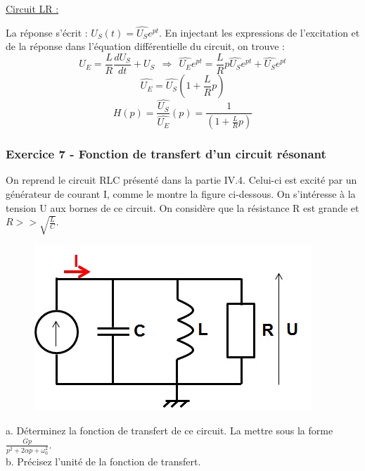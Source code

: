 \documentclass[11pt]{report}
\begin{document}
	\underline{Circuit LR :}
	
	La réponse s'écrit : $U_S(t)=\hat{U_S}e^{pt}$. En injectant les expressions de l'excitation et de la réponse dans l'équation différentielle du circuit, on trouve :
	\begin{equation*}
	U_E=\frac{L}{R}\frac{dU_S}{dt}+U_S~~\Rightarrow~~\hat{U_E}e^{pt}=\frac{L}{R}p\hat{U_S}e^{pt}+\hat{U_S}e^{pt}
	\end{equation*}
	\begin{equation*}
	\hat{U_E}=\hat{U_S}(1+\frac{L}{R}p)
	\end{equation*}
	\begin{equation*}
	H(p)=\frac{\hat{U_S}}{\hat{U_E}}(p)=\frac{1}{(1+\frac{L}{R}p)}
	\end{equation*}
	 	
 	
 	\vspace{1\baselineskip}
 	
 	\subsubsection{Exercice 7 - Fonction de transfert d'un circuit résonant}
 	
 	On reprend le circuit RLC présenté dans la partie IV.4. Celui-ci est excité par un générateur de courant I, comme le montre la figure ci-dessous. On s'intéresse à la tension U aux bornes de ce circuit. On considère que la résistance R est grande et $R>>\sqrt{\frac{L}{C}}$.
 	 	
 	\begin{figure}[h!]
 		\centering
 		\includegraphics[scale=0.5]{images/Exo_2_5.jpg} 
 	\end{figure} 
 
 	a. Déterminez la fonction de transfert de ce circuit. La mettre sous la forme $\frac{Gp}{p^2+2\alpha p+\omega_{0}^{2}}$.\\
 	
 	b. Précisez l'unité de la fonction de transfert. \\
 	
\end{document}
